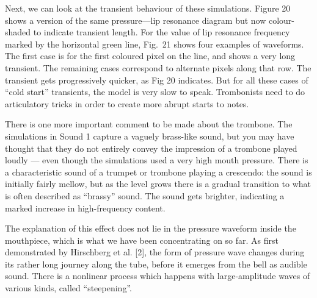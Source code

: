 
  Next, we can look at the transient behaviour of these simulations. Figure 20 
  shows a version of the same pressure—lip resonance diagram but now 
  colour-shaded to indicate transient length. For the value of lip resonance 
  frequency marked by the horizontal green line, Fig.\ 21 shows four examples 
  of waveforms. The first case is for the first coloured pixel on the line, and 
  shows a very long transient. The remaining cases correspond to alternate 
  pixels along that row. The transient gets progressively quicker, as Fig 20 
  indicates. But for all these cases of “cold start” transients, the model is 
  very slow to speak. Trombonists need to do articulatory tricks in order to 
  create more abrupt starts to notes. 






  There is one more important comment to be made about the trombone. The 
  simulations in Sound 1 capture a vaguely brass-like sound, but you may have 
  thought that they do not entirely convey the impression of a trombone played 
  loudly — even though the simulations used a very high mouth pressure. There 
  is a characteristic sound of a trumpet or trombone playing a crescendo: the 
  sound is initially fairly mellow, but as the level grows there is a gradual 
  transition to what is often described as “brassy” sound. The sound gets 
  brighter, indicating a marked increase in high-frequency content. 

  The explanation of this effect does not lie in the pressure waveform inside 
  the mouthpiece, which is what we have been concentrating on so far. As first 
  demonstrated by Hirschberg et al. [2], the form of pressure wave changes 
  during its rather long journey along the tube, before it emerges from the 
  bell as audible sound. There is a nonlinear process which happens with 
  large-amplitude waves of various kinds, called “steepening”. 

